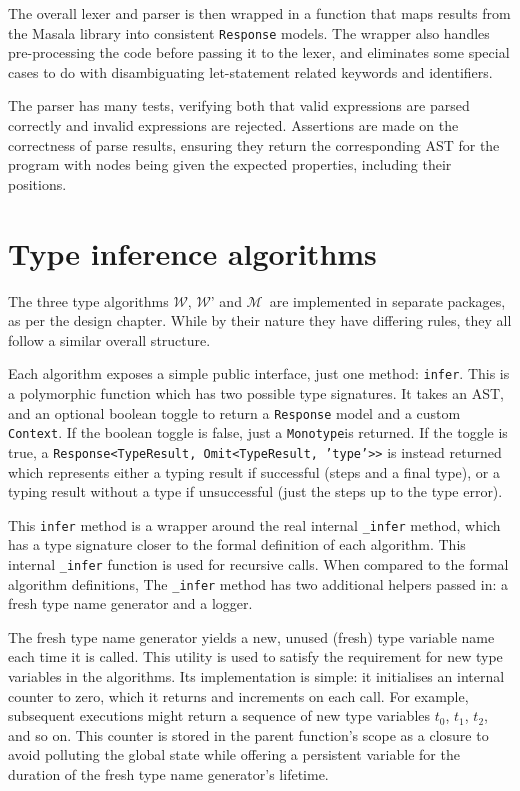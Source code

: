 \documentclass[a4paper,fleqn,oneside,12pt]{report}
\newcommand{\W}{$\mathcal{W}$}
\newcommand{\M}{$\mathcal{M}$}
\begin{document}
The overall lexer and parser is then wrapped in a function that maps results from the Masala library into consistent \texttt{Response} models. The wrapper also handles pre-processing the code before passing it to the lexer, and eliminates some special cases to do with disambiguating let-statement related keywords and identifiers.

The parser has many tests, verifying both that valid expressions are parsed correctly and invalid expressions are rejected. Assertions are made on the correctness of parse results, ensuring they return the corresponding AST for the program with nodes being given the expected properties, including their positions.

\section{Type inference algorithms}\label{id:h.flyu66glh76t}

The three type algorithms \W, \W’ and \M\ are implemented in separate packages, as per the design chapter. While by their nature they have differing rules, they all follow a similar overall structure.

Each algorithm exposes a simple public interface, just one method: \texttt{infer}. This is a polymorphic function which has two possible type signatures. It takes an AST, and an optional boolean toggle to return a \texttt{Response} model and a custom \texttt{Context}. If the boolean toggle is false, just a \texttt{Monotype}is returned. If the toggle is true, a \texttt{Response<TypeResult, Omit<TypeResult, 'type'>>} is instead returned which represents either a typing result if successful (steps and a final type), or a typing result without a type if unsuccessful (just the steps up to the type error).

This \texttt{infer} method is a wrapper around the real internal \texttt{_infer} method, which has a type signature closer to the formal definition of each algorithm. This internal \texttt{_infer} function is used for recursive calls. When compared to the formal algorithm definitions, The \texttt{_infer} method has two additional helpers passed in: a fresh type name generator and a logger.

The fresh type name generator yields a new, unused (fresh) type variable name each time it is called. This utility is used to satisfy the requirement for new type variables in the algorithms. Its implementation is simple: it initialises an internal counter to zero, which it returns and increments on each call. For example, subsequent executions might return a sequence of new type variables $t_0$, $t_1$, $t_2$, and so on. This counter is stored in the parent function's scope as a closure to avoid polluting the global state while offering a persistent variable for the duration of the fresh type name generator's lifetime.
\end{document}
